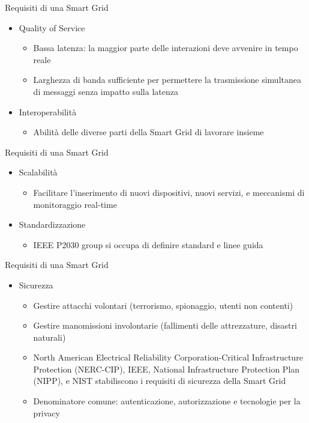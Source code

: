 \begin{frame}{Requisiti di una Smart Grid}
\begin{itemize}[<+- | alert@+>]
\item Quality of Service
	\begin{itemize}
		\item Bassa latenza: la maggior parte delle interazioni deve avvenire in tempo reale
		\item Larghezza di banda sufficiente per permettere la trasmissione simultanea di messaggi senza impatto sulla latenza
	\end{itemize}
\item Interoperabilità
	\begin{itemize}
		\item Abilità delle diverse parti della Smart Grid di lavorare insieme
	\end{itemize}
\end{itemize}
\end{frame}

\begin{frame}{Requisiti di una Smart Grid}
\begin{itemize}[<+- | alert@+>]
\item Scalabilità
	\begin{itemize}
		\item Facilitare l’inserimento di nuovi dispositivi, nuovi servizi, e meccanismi di monitoraggio real-time
	\end{itemize}
\item Standardizzazione
	\begin{itemize}
		\item IEEE P2030 group si occupa di definire standard e linee guida
	\end{itemize}
\end{itemize}
\end{frame}

\begin{frame}{Requisiti di una Smart Grid}
\begin{itemize}[<+- | alert@+>]
\item Sicurezza
	\begin{itemize}
		\item Gestire attacchi volontari (terrorismo, spionaggio, utenti non contenti)
		\item Gestire manomissioni involontarie (fallimenti delle attrezzature, disastri naturali)
		\item North American Electrical Reliability Corporation-Critical Infrastructure Protection (NERC-CIP), IEEE, National Infrastructure Protection Plan (NIPP), e NIST stabiliscono i requisiti di sicurezza della Smart Grid
		\item Denominatore comune: autenticazione, autorizzazione e tecnologie per la privacy
	\end{itemize}
\end{itemize}
\end{frame}


